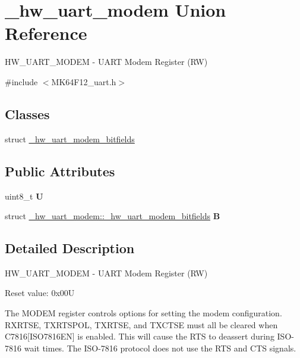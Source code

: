 \hypertarget{union__hw__uart__modem}{}\section{\+\_\+hw\+\_\+uart\+\_\+modem Union Reference}
\label{union__hw__uart__modem}


H\+W\+\_\+\+U\+A\+R\+T\+\_\+\+M\+O\+D\+EM -\/ U\+A\+RT Modem Register (RW)  




{\ttfamily \#include $<$M\+K64\+F12\+\_\+uart.\+h$>$}

\subsection*{Classes}
\begin{DoxyCompactItemize}
\item 
struct \hyperlink{struct__hw__uart__modem_1_1__hw__uart__modem__bitfields}{\+\_\+hw\+\_\+uart\+\_\+modem\+\_\+bitfields}
\end{DoxyCompactItemize}
\subsection*{Public Attributes}
\begin{DoxyCompactItemize}
\item 
uint8\+\_\+t {\bfseries U}\hypertarget{union__hw__uart__modem_a156872018d915d17fae9d32b76bcc1a2}{}\label{union__hw__uart__modem_a156872018d915d17fae9d32b76bcc1a2}

\item 
struct \hyperlink{struct__hw__uart__modem_1_1__hw__uart__modem__bitfields}{\+\_\+hw\+\_\+uart\+\_\+modem\+::\+\_\+hw\+\_\+uart\+\_\+modem\+\_\+bitfields} {\bfseries B}\hypertarget{union__hw__uart__modem_a99160c90070767b87ae2d7de7622490f}{}\label{union__hw__uart__modem_a99160c90070767b87ae2d7de7622490f}

\end{DoxyCompactItemize}


\subsection{Detailed Description}
H\+W\+\_\+\+U\+A\+R\+T\+\_\+\+M\+O\+D\+EM -\/ U\+A\+RT Modem Register (RW) 

Reset value\+: 0x00U

The M\+O\+D\+EM register controls options for setting the modem configuration. R\+X\+R\+T\+SE, T\+X\+R\+T\+S\+P\+OL, T\+X\+R\+T\+SE, and T\+X\+C\+T\+SE must all be cleared when C7816\mbox{[}I\+S\+O7816\+EN\mbox{]} is enabled. This will cause the R\+TS to deassert during I\+S\+O-\/7816 wait times. The I\+S\+O-\/7816 protocol does not use the R\+TS and C\+TS signals. 

